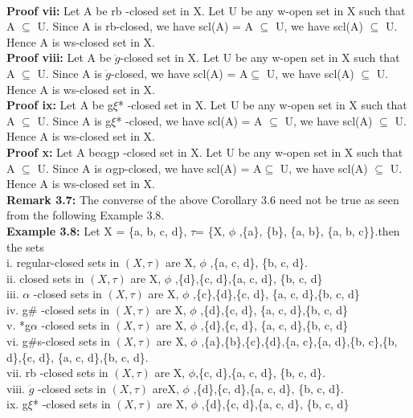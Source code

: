 {		\\\textbf{Proof vii: } Let A be rb -closed set in X. Let U be any w-open set in X such that  A $\subseteq$ U. Since A is rb-closed, we have scl(A) = A $\subseteq$ U, we have  scl(A) $\subseteq$ U.   Hence A is ws-closed set in X.
		\\\textbf{Proof viii:} Let A be   $\ddot{g}$-closed set in X. Let U be any w-open set in X such that  A $\subseteq$ U. Since A is  $\ddot{g}$-closed, we have scl(A) = A$\subseteq$ U, we have  scl(A) $\subseteq$ U.   Hence A is ws-closed set in X.
		\\\textbf{Proof ix: } Let A be g$\xi$* -closed set in X. Let U be any w-open set in X such that  A $\subseteq$ U. Since A is g$\xi$* -closed, we have scl(A) = A $\subseteq$ U, we have  scl(A) $\subseteq$ U.   Hence A is ws-closed set in X.
		\\\textbf{Proof x: }Let A be$\alpha$gp -closed set in X. Let U be any w-open set in X such that  A $\subseteq$ U. Since A is $\alpha$gp-closed, we have scl(A) = A$\subseteq$ U, we have  scl(A) $\subseteq$ U.   Hence A is ws-closed  set in  X.
		\\\textbf{Remark 3.7:} The converse of the above Corollary 3.6 need not be true as seen from the following Example 3.8.
		\\\textbf{Example 3.8:} Let X = \{a, b, c, d\},   $\tau$= \{X, $\phi$ ,\{a\}, \{b\}, \{a, b\}, \{a, b, c\}\}.then the sets
		\\i.	regular-closed sets in $(X,\tau)$ are X, $\phi$ ,\{a, c, d\}, \{b, c, d\}.
		\\ii.	closed sets in $(X,\tau)$ are X, $\phi$ ,\{d\},\{c, d\},\{a, c, d\}, \{b, c, d\}
		\\iii.	 $\alpha$ -closed sets in $(X,\tau)$ are X, $\phi$ ,\{c\},\{d\},\{c, d\}, \{a, c, d\},\{b, c, d\}
		\\iv.	g$\#$ -closed sets in $(X,\tau)$ are X, $\phi$ ,\{d\},\{c, d\}, \{a, c, d\},\{b, c, d\}
		\\v.	*g$\alpha$ -closed sets in $(X,\tau)$ are X, $\phi$ ,\{d\},\{c, d\}, \{a, c, d\},\{b, c, d\}
		\\vi.	g$\#$s-closed sets in $(X,\tau)$ are X, $\phi$ ,\{a\},\{b\},\{c\},\{d\},\{a, c\},\{a, d\},\{b, c\},\{b, d\},\{c, d\}, \{a, c, d\},\{b, c, d\}.
		\\vii.	rb -closed sets in $(X,\tau)$ are X, $\phi$,\{c, d\},\{a, c, d\}, \{b, c, d\}.
		\\viii.	  $\ddot{g}$ -closed sets in $(X,\tau)$ areX, $\phi$ ,\{d\},\{c, d\},\{a, c, d\}, \{b, c, d\}.
		\\ix.	 g$\xi$*  -closed sets in $(X,\tau)$ are X, $\phi$ ,\{d\},\{c, d\},\{a, c, d\}, \{b, c, d\}
}
